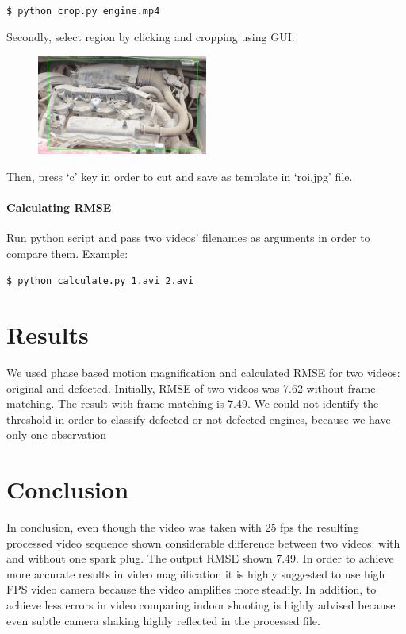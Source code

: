 \documentclass{IEEEtran}
\begin{document}
\texttt{\$ python crop.py engine.mp4 }

Secondly, select region by clicking and cropping using GUI:

\begin{figure}[h]
	\centering
	\includegraphics[width=0.5\textwidth]{RMSE}
	\label{fig:RMSE}
\end{figure}

Then, press ‘c’ key in order to cut and save as template in ‘roi.jpg’ file.

\paragraph{Calculating RMSE}

Run python script and pass two videos’ filenames as arguments in order to compare them. 
Example:

\texttt{\$ python calculate.py 1.avi 2.avi}

\section{Results}

We used phase based motion magnification and calculated RMSE for two videos: original and defected. Initially, RMSE of two videos was 7.62 without frame matching. The result with frame matching is 7.49. We could not identify the threshold in order to classify defected or not defected engines, because we have only one observation

\section{Conclusion}

In conclusion, even though the video was taken with 25 fps the resulting processed video sequence shown considerable difference between two videos: with and without one spark plug. The output RMSE shown 7.49. In order to achieve more accurate results in video magnification it is highly suggested to use high FPS video camera because the video amplifies more steadily. In addition, to achieve less errors in video comparing indoor shooting is highly advised because even subtle camera shaking highly reflected in the processed file.



\printbibliography
\end{document}
